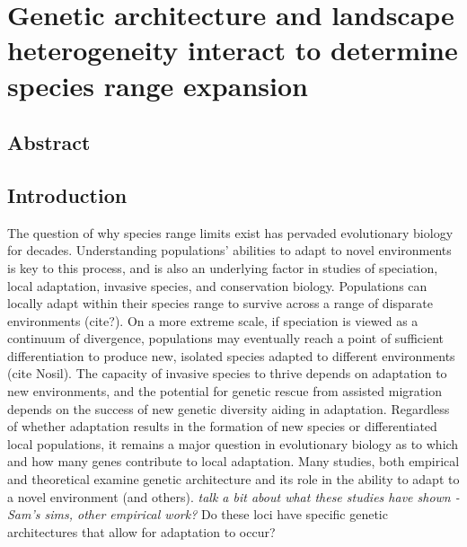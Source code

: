 \chapter{Genetic architecture and landscape heterogeneity interact to determine species range expansion}%
\label{chap:heterogeneouslandscapes}

\section{Abstract}


\section{Introduction}




The question of why species range limits exist has pervaded evolutionary biology for decades. Understanding populations' abilities to adapt to novel environments is key to this process, and is also an underlying factor in studies of speciation, local adaptation, invasive species, and conservation biology. 
Populations can locally adapt within their species range to survive across a range of disparate environments (cite?). On a more extreme scale, if speciation is viewed as a continuum of divergence, populations may eventually reach a point of sufficient differentiation to produce new, isolated species adapted to different environments (cite Nosil). The capacity of invasive species to thrive depends on adaptation to new environments, and the potential for genetic rescue from assisted migration depends on the success of new genetic diversity aiding in adaptation. 
Regardless of whether adaptation results in the formation of new species or differentiated local populations, it remains a major question in evolutionary biology as to which and how many genes contribute to local adaptation. Many studies, both empirical and theoretical examine genetic architecture and its role in the ability to adapt to a novel environment \citep{Yeaman:2015}(and others). \emph{talk a bit about what these studies have shown - Sam's sims, other empirical work?} Do these loci have specific genetic architectures that allow for adaptation to occur? 

